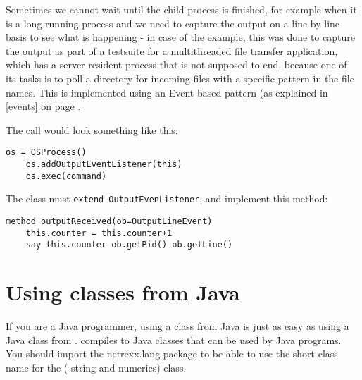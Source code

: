 {Sometimes we cannot wait until the child process is finished, for
example when it is a long running process and we need to capture the
output on a line-by-line basis to see what is happening - in case of
the example, this was done to capture the output as part of a
testsuite for a multithreaded file transfer application, which has a
server resident process that is not supposed to end, because one of
its tasks is to poll a directory for incoming files with a specific
pattern in the file names. This is implemented using an Event based
pattern (as explained in \ref{events}  on page \pageref{events}. 
 

 

The call would look something like this:
\begin{lstlisting}[label=callosprocessexample,caption=Example of calling the OSProcess class - registering an eventhandler]
    os = OSProcess()
    os.addOutputEventListener(this)
    os.exec(command)
\end{lstlisting}

The class must \texttt{extend OutputEvenListener}, and implement this
method:

\begin{lstlisting}[label=registerhandlerexample,caption=Example of implementing the listener method]
  method outputReceived(ob=OutputLineEvent)
    this.counter = this.counter+1
    say this.counter ob.getPid() ob.getLine()
\end{lstlisting}

\chapter{Using \nr{} classes from Java}
If you are a Java programmer, using a \nr{} class from Java is just as
easy as using a Java class from \nr{}. \nr{} compiles to Java classes that can be used by Java programs.
You should import the netrexx.lang package to be able to use the short
class name for the \Rexx{} (\nr{} string and numerics) class.

}
